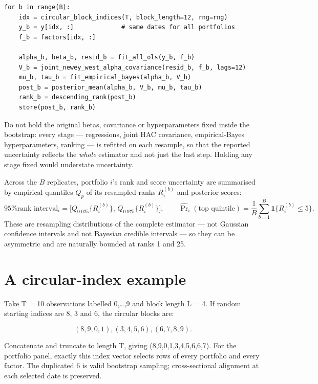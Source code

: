 \begin{verbatim}
for b in range(B):
    idx = circular_block_indices(T, block_length=12, rng=rng)
    y_b = y[idx, :]             # same dates for all portfolios
    f_b = factors[idx, :]

    alpha_b, beta_b, resid_b = fit_all_ols(y_b, f_b)
    V_b = joint_newey_west_alpha_covariance(resid_b, f_b, lags=12)
    mu_b, tau_b = fit_empirical_bayes(alpha_b, V_b)
    post_b = posterior_mean(alpha_b, V_b, mu_b, tau_b)
    rank_b = descending_rank(post_b)
    store(post_b, rank_b)
\end{verbatim}

Do not hold the original betas, covariance or hyperparameters fixed inside
the bootstrap: every stage --- regressions, joint HAC covariance,
empirical-Bayes hyperparameters, ranking --- is refitted on each resample, so
that the reported uncertainty reflects the \emph{whole} estimator and not
just the last step. Holding any stage fixed would understate uncertainty.

Across the $B$ replicates, portfolio $i$'s rank and score uncertainty are
summarised by empirical quantiles $Q_p$ of its resampled ranks $R_i^{(b)}$
and posterior scores:
\begin{equation}\label{eq:ch9-estimand}
\text{95\% rank interval}_i = \bigl[Q_{0.025}\{R_i^{(b)}\},\,Q_{0.975}\{R_i^{(b)}\}\bigr],
\qquad
\widehat{\Pr}_i(\text{top quintile}) = \frac{1}{B}\sum_{b=1}^{B}\mathbf{1}\{R_i^{(b)}\le5\}.
\end{equation}
These are resampling distributions of the complete estimator --- not Gaussian
confidence intervals and not Bayesian credible intervals --- so they can be
asymmetric and are naturally bounded at ranks 1 and 25.

\hypertarget{a-circular-index-example}{%
\section{A circular-index example}\label{a-circular-index-example}}

Take T = 10 observations labelled 0,\ldots,9 and block length L = 4. If
random starting indices are 8, 3 and 6, the circular blocks are:

\begin{equation}
(8,9,0,1), (3,4,5,6), (6,7,8,9).
\end{equation}

Concatenate and truncate to length T, giving (8,9,0,1,3,4,5,6,6,7). For
the portfolio panel, exactly this index vector selects rows of every
portfolio and every factor. The duplicated 6 is valid bootstrap
sampling; cross-sectional alignment at each selected date is preserved.

